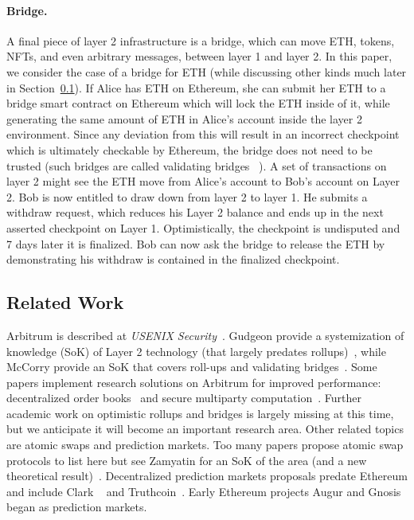 \paragraph{Bridge.} A final piece of layer 2 infrastructure is a bridge, which can move ETH, tokens, NFTs, and even arbitrary messages, between layer 1 and layer 2. In this paper, we consider the case of a bridge for ETH (while discussing other kinds much later in Section~\ref{}). If Alice has ETH on Ethereum, she can submit her ETH to a bridge smart contract on Ethereum which will lock the ETH inside of it, while generating the same amount of ETH in Alice's account inside the layer 2 environment. Since any deviation from this will result in  an incorrect checkpoint which is ultimately checkable by Ethereum, the bridge does not need to be trusted (such bridges are called validating bridges ~\cite{mccorry2021sok}). A set of transactions on layer 2 might see the ETH move from Alice's account to Bob's account on Layer 2. Bob is now entitled to draw down from layer 2 to layer 1. He submits a withdraw request, which reduces his Layer 2 balance and ends up in the next asserted checkpoint on Layer 1. Optimistically, the checkpoint is undisputed and 7 days later it is finalized. Bob can now ask the bridge to release the ETH by demonstrating his withdraw is contained in the finalized checkpoint.

\subsection{Related Work} 

Arbitrum is described at \textit{USENIX Security}~\cite{kalodner2018arbitrum}. Gudgeon \etal provide a systemization of knowledge (SoK) of Layer 2 technology (that largely predates rollups)~\cite{gudgeon2019sok}, while McCorry \etal provide an SoK that covers roll-ups and validating bridges~\cite{mccorry2021sok}. Some papers implement research solutions on Arbitrum for improved performance:  decentralized order books~\cite{moosavi2021lissy} and secure multiparty computation~\cite{demirag2021absentia}. Further academic work on optimistic rollups and bridges is largely missing at this time, but we anticipate it will become an important research area.  Other related topics are atomic swaps and prediction markets. Too many papers propose atomic swap protocols to list here but see Zamyatin \etal for an SoK of the area (and a new theoretical result)~\cite{zamyatin2021sok}. Decentralized prediction markets proposals predate Ethereum and include Clark \etal~\cite{clark2014decentralizing} and Truthcoin~\cite{sztorc2015truthcoin}. Early Ethereum projects Augur and Gnosis began as prediction markets. 

